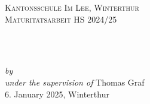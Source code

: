 \begin{titlepage}
    \vspace*{5cm}
    \makeatletter
    \begin{center}
      \textsc{Kantonsschule Im Lee, Winterthur\\Maturitätsarbeit HS 2024/25}\\
      \vspace*{1cm}
      \begin{Huge}
        \@title
      \end{Huge}\\[0.1cm]
      \begin{Large}
        \@subtitle
      \end{Large}\\
      \emph{by}
      \@author\\
      \emph{under the supervision of}
      Thomas Graf\\
      \vfill
      6. January 2025, Winterthur
    \end{center}
    \makeatother
\end{titlepage}
  
\newpage
\null
\thispagestyle{empty}
\newpage
  
